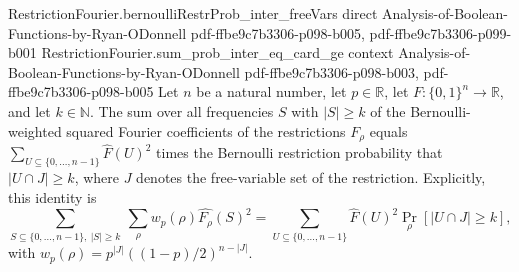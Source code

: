 \begin{lemma}
  {RestrictionFourier.bernoulliRestrProb_inter_freeVars}
  {direct}
  {Analysis-of-Boolean-Functions-by-Ryan-ODonnell}
  {pdf-ffbe9c7b3306-p098-b005,
    pdf-ffbe9c7b3306-p099-b001}
\proofstep
  {RestrictionFourier.sum_prob_inter_eq_card_ge}
  {context}
  {Analysis-of-Boolean-Functions-by-Ryan-ODonnell}
  {pdf-ffbe9c7b3306-p098-b003,
    pdf-ffbe9c7b3306-p098-b005}
Let $n$ be a natural number, let $p\in\mathbb{R}$, let $F:\{0,1\}^n\to\mathbb{R}$, and
let $k\in\mathbb{N}$. The sum over all frequencies $S$ with $|S|\ge k$ of the
Bernoulli-weighted squared Fourier coefficients of the restrictions $F_\rho$ equals
$\sum_{U\subseteq\{0,\ldots,n-1\}}\widehat F(U)^2$ times the Bernoulli restriction
probability that $|U\cap J|\ge k$, where $J$ denotes the free-variable set of the
restriction. Explicitly, this identity is
\[\sum_{S\subseteq\{0,\ldots,n-1\},\ |S|\ge k}\ \sum_\rho w_p(\rho)\widehat{F_\rho}(S)^2=\sum_{U\subseteq\{0,\ldots,n-1\}}\widehat F(U)^2\Pr_\rho[|U\cap J|\ge k],\]
with $w_p(\rho)=p^{|J|}((1-p)/2)^{n-|J|}$.
\end{lemma}


